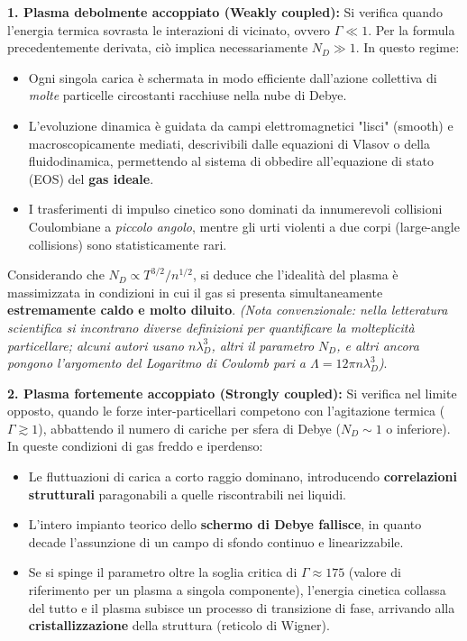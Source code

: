 \textbf{1. Plasma debolmente accoppiato (Weakly coupled):}
Si verifica quando l'energia termica sovrasta le interazioni di vicinato, ovvero $\Gamma \ll 1$. Per la formula precedentemente derivata, ciò implica necessariamente $N_D \gg 1$. In questo regime:
\begin{itemize}
\item Ogni singola carica è schermata in modo efficiente dall'azione collettiva di \textit{molte} particelle circostanti racchiuse nella nube di Debye.
\item L'evoluzione dinamica è guidata da campi elettromagnetici "lisci" (smooth) e macroscopicamente mediati, descrivibili dalle equazioni di Vlasov o della fluidodinamica, permettendo al sistema di obbedire all'equazione di stato (EOS) del \textbf{gas ideale}.
\item I trasferimenti di impulso cinetico sono dominati da innumerevoli collisioni Coulombiane a \textit{piccolo angolo}, mentre gli urti violenti a due corpi (large-angle collisions) sono statisticamente rari.
\end{itemize}
Considerando che $N_D \propto T^{3/2} / n^{1/2}$, si deduce che l'idealità del plasma è massimizzata in condizioni in cui il gas si presenta simultaneamente \textbf{estremamente caldo e molto diluito}. \textit{(Nota convenzionale: nella letteratura scientifica si incontrano diverse definizioni per quantificare la molteplicità particellare; alcuni autori usano $n\lambda_D^3$, altri il parametro $N_D$, e altri ancora pongono l'argomento del Logaritmo di Coulomb pari a $\Lambda = 12\pi n \lambda_D^3$)}.

\textbf{2. Plasma fortemente accoppiato (Strongly coupled):}
Si verifica nel limite opposto, quando le forze inter-particellari competono con l'agitazione termica ($\Gamma \gtrsim 1$), abbattendo il numero di cariche per sfera di Debye ($N_D \sim 1$ o inferiore). In queste condizioni di gas freddo e iperdenso:
\begin{itemize}
\item Le fluttuazioni di carica a corto raggio dominano, introducendo \textbf{correlazioni strutturali} paragonabili a quelle riscontrabili nei liquidi.
\item L'intero impianto teorico dello \textbf{schermo di Debye fallisce}, in quanto decade l'assunzione di un campo di sfondo continuo e linearizzabile.
\item Se si spinge il parametro oltre la soglia critica di $\Gamma \approx 175$ (valore di riferimento per un plasma a singola componente), l'energia cinetica collassa del tutto e il plasma subisce un processo di transizione di fase, arrivando alla \textbf{cristallizzazione} della struttura (reticolo di Wigner).
\end{itemize}

